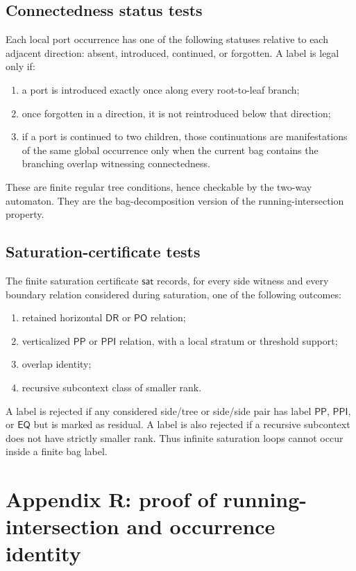 \documentclass[11pt]{article}
\newcommand{\EQ}{\mathsf{EQ}}
\newcommand{\PP}{\mathsf{PP}}
\newcommand{\PPI}{\mathsf{PPI}}
\newcommand{\PO}{\mathsf{PO}}
\newcommand{\DR}{\mathsf{DR}}
\begin{document}
\subsection{Connectedness status tests}

Each local port occurrence has one of the following statuses relative to each adjacent direction: absent, introduced, continued, or forgotten.  A label is legal only if:
\begin{enumerate}[label=(C\arabic*)]
\item a port is introduced exactly once along every root-to-leaf branch;
\item once forgotten in a direction, it is not reintroduced below that direction;
\item if a port is continued to two children, those continuations are manifestations of the same global occurrence only when the current bag contains the branching overlap witnessing connectedness.
\end{enumerate}
These are finite regular tree conditions, hence checkable by the two-way automaton.  They are the bag-decomposition version of the running-intersection property.

\subsection{Saturation-certificate tests}

The finite saturation certificate $\mathsf{sat}$ records, for every side witness and every boundary relation considered during saturation, one of the following outcomes:
\begin{enumerate}[label=(S\arabic*)]
\item retained horizontal $\DR$ or $\PO$ relation;
\item verticalized $\PP$ or $\PPI$ relation, with a local stratum or threshold support;
\item overlap identity;
\item recursive subcontext class of smaller rank.
\end{enumerate}
A label is rejected if any considered side/tree or side/side pair has label $\PP$, $\PPI$, or $\EQ$ but is marked as residual.  A label is also rejected if a recursive subcontext does not have strictly smaller rank.  Thus infinite saturation loops cannot occur inside a finite bag label.

\section{Appendix R: proof of running-intersection and occurrence identity}
\end{document}
